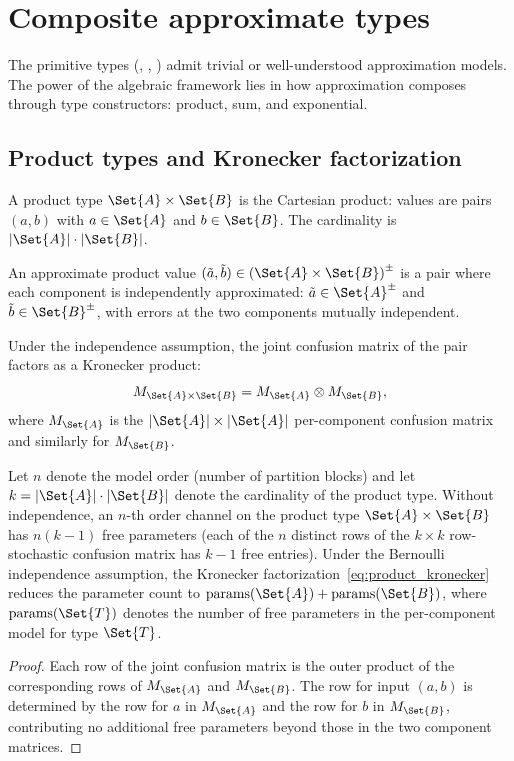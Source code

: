 \documentclass[ ../main.tex]{subfiles}
\begin{document}
\section{Composite approximate types}
\label{sec:composite}

The primitive types (\Void, \Unit, \Bool) admit trivial or well-understood approximation models.
The power of the algebraic framework lies in how approximation composes through type constructors: product, sum, and exponential.

\subsection{Product types and Kronecker factorization}
\label{sec:product}

A product type $\Set{A} \times \Set{B}$ is the Cartesian product: values are pairs $(a, b)$ with $a \in \Set{A}$ and $b \in \Set{B}$.
The cardinality is $|\Set{A}| \cdot |\Set{B}|$.

\begin{definition}
An approximate product value $(\tilde{a}, \tilde{b}) \in \AT{(\Set{A} \times \Set{B})}$ is a pair where each component is independently approximated: $\tilde{a} \in \AT{\Set{A}}$ and $\tilde{b} \in \AT{\Set{B}}$, with errors at the two components mutually independent.
\end{definition}

Under the independence assumption, the joint confusion matrix of the pair factors as a Kronecker product:
\begin{equation}
\label{eq:product_kronecker}
M_{\Set{A} \times \Set{B}} = M_{\Set{A}} \otimes M_{\Set{B}},
\end{equation}
where $M_{\Set{A}}$ is the $|\Set{A}| \times |\Set{A}|$ per-component confusion matrix and similarly for $M_{\Set{B}}$.

\begin{theorem}
\label{thm:product_parsimony}
Let $n$ denote the model order (number of partition blocks) and let $k = |\Set{A}| \cdot |\Set{B}|$ denote the cardinality of the product type.
Without independence, an $n$-th order channel on the product type $\Set{A} \times \Set{B}$ has $n(k - 1)$ free parameters (each of the $n$ distinct rows of the $k \times k$ row-stochastic confusion matrix has $k - 1$ free entries).
Under the Bernoulli independence assumption, the Kronecker factorization~\eqref{eq:product_kronecker} reduces the parameter count to $\mathrm{params}(\Set{A}) + \mathrm{params}(\Set{B})$, where $\mathrm{params}(\Set{T})$ denotes the number of free parameters in the per-component model for type $\Set{T}$.
\end{theorem}
\begin{proof}
Each row of the joint confusion matrix is the outer product of the corresponding rows of $M_{\Set{A}}$ and $M_{\Set{B}}$.
The row for input $(a, b)$ is determined by the row for $a$ in $M_{\Set{A}}$ and the row for $b$ in $M_{\Set{B}}$, contributing no additional free parameters beyond those in the two component matrices.
\end{proof}
\end{document}
